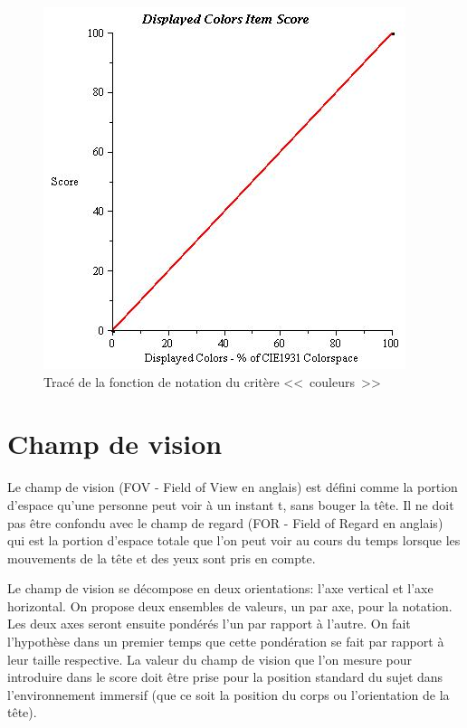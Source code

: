 	\begin{figure}
		\centering
		\includegraphics[scale=1]{Figures/Color}
		\caption{Tracé de la fonction de notation du critère <<~couleurs~>>}
		\label{fig:score_color}
	\end{figure}
	
	\section{Champ de vision}
	\par Le champ de vision (FOV - Field of View en anglais) est défini comme la portion d'espace qu'une personne peut voir à un instant t, sans bouger la tête. Il ne doit pas être confondu avec le champ de regard (FOR - Field of Regard en anglais) qui est la portion d'espace totale que l'on peut voir au cours du temps lorsque les mouvements de la tête et des yeux sont pris en compte.

	\par Le champ de vision se décompose en deux orientations: l'axe vertical et l'axe horizontal. On propose deux ensembles de valeurs, un par axe, pour la notation. Les deux axes seront ensuite pondérés l'un par rapport à l'autre. On fait l'hypothèse dans un premier temps que cette pondération se fait par rapport à leur taille respective. La valeur du champ de vision que l'on mesure pour introduire dans le score doit être prise pour la position standard du sujet dans l'environnement immersif (que ce soit la position du corps ou l'orientation de la tête).
	
